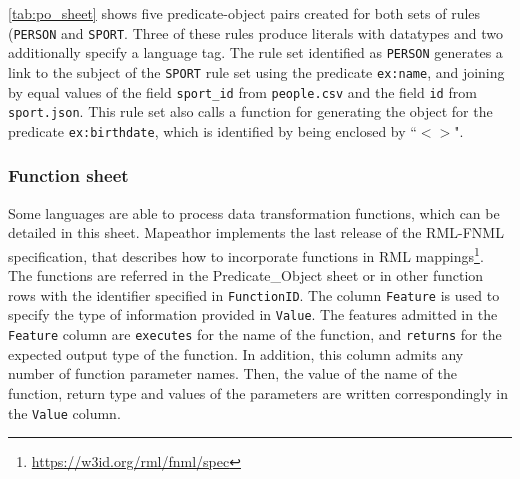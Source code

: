 \cref{tab:po_sheet} shows five predicate-object pairs created for both sets of rules (\texttt{PERSON} and \texttt{SPORT}. Three of these rules produce literals with datatypes and two additionally specify a language tag. The rule set identified as \texttt{PERSON} generates a link to the subject of the \texttt{SPORT} rule set using the predicate \texttt{ex:name}, and joining by equal values of the field \texttt{sport\_id} from \texttt{people.csv} and the field \texttt{id} from \texttt{sport.json}. This rule set also calls a function for generating the object for the predicate \texttt{ex:birthdate}, which is identified by being enclosed by ``$<>$".

\begin{table}[h!]
\caption{Predicate\_Object sheet.}
\label{tab:po_sheet}
\centering
{}
\end{table}

\subsubsection{Function sheet} Some languages are able to process data transformation functions, which can be detailed in this sheet. Mapeathor implements the last release of the RML-FNML specification, that describes how to incorporate functions in RML mappings\footnote{\url{https://w3id.org/rml/fnml/spec}}. The functions are referred in the Predicate\_Object sheet or in other function rows with the identifier specified in \texttt{FunctionID}. The column \texttt{Feature} is used to specify the type of information provided in \texttt{Value}. The features admitted in the \texttt{Feature} column are \texttt{executes} for the name of the function, and \texttt{returns} for the expected output type of the function. In addition, this column admits any number of function parameter names. Then, the value of the name of the function, return type and values of the parameters are written correspondingly in the \texttt{Value} column.

